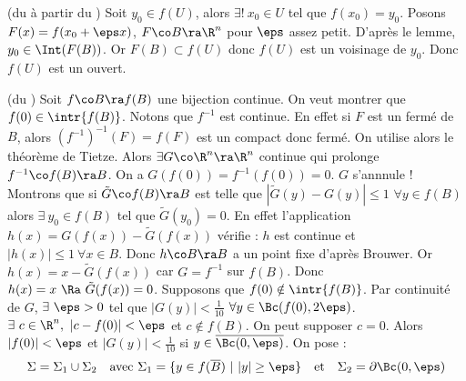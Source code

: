 
\prv (du  à partir du )
\dl Soit $y_0\in f(U)$, alors $\exists!\ x_0\in U$ tel que $f(x_0)=y_0$. Posons $F(x)=f(x_0+\eps x)$, $F\co B\ra\R^n$ pour $\eps$ assez petit. D'après le lemme, $y_0\in\Int(F(B))$. Or $F(B)\subset f(U)$ donc $f(U)$ est un voisinage de $y_0$. Donc $f(U)$ est un ouvert.
\prvf


\prv (du )
\dl Soit $f\co B\ra f(B)$ une bijection continue.  On veut montrer que $f(0)\in\intr{f(B)}$. 
\dl Notons que $f^{-1}$ est continue. En effet si $F$ est un fermé de $B$, alors $(f^{-1})^{-1}(F)=f(F)$ est un compact donc fermé. On utilise alors le théorème de Tietze.
\dl Alors $\exists G\co\R^n\ra\R^n$ continue qui prolonge $f^{-1}\co f(B)\ra B$. On a $G(f(0))=f^{-1}(f(0))=0$. $G$ s'annnule !
\dl Montrons que si $\tilde G\co f(B)\ra B$ est telle que $|\tilde G(y)-G(y)|\le 1$ $\forall y\in f(B)$ alors $\exists\ y_0\in f(B)$ tel que $\tilde G(y_0)=0$.
\dl En effet l'application $h(x)=G(f(x))-\tilde G(f(x))$ vérifie : $h$ est continue et $|h(x)|\le 1\ \forall x\in B$. Donc $h\co B\ra B$ a un point fixe d'après Brouwer. Or $h(x)=x-\tilde G(f(x))$ car $G=f^{-1}$ sur $f(B)$. Donc $h(x)=x\ \Ra\ \tilde G(f(x))=0$.
\dl Supposons que $f(0)\notin\intr{f(B)}$. Par continuité de $G$, $\exists\ \eps>0$ tel que $|G(y)|<\frac{1}{10}$ $\forall y\in\Bc(f(0),2\eps)$. $\exists\ c\in\R^n,\ |c-f(0)|<\eps$ et $c\notin f(B)$. On peut supposer $c=0$.
\dl Alors $|f(0)|<\eps$ et $|G(y)|<\frac{1}{10}$ si $y\in\overline{\Bc(0,\eps)}$. On pose :
$$\Sigma=\Sigma_1\cup\Sigma_2\quad\text{avec }\Sigma_1=\{y\in f(\overline B)\ |\ |y|\ge\eps\}\quad\text{et}\quad\Sigma_2=\partial\Bc(0,\eps)$$
